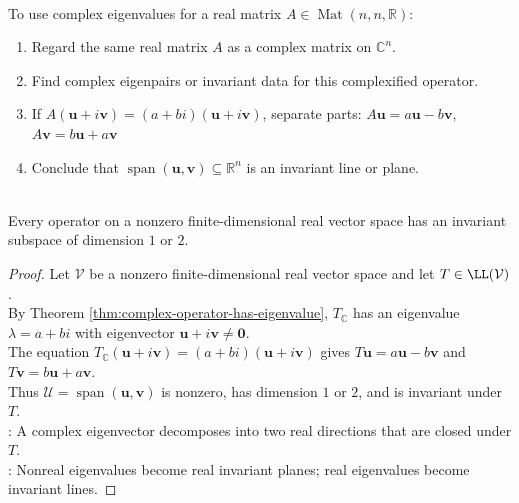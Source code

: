 \begin{method} \label{meth:complexify-real-matrix} \\
To use complex eigenvalues for a real matrix $A\in\operatorname{Mat}(n,n,\mathbb{R})$:
\begin{enumerate}[label=(\roman*)]
\setlength{\itemsep}{0pt}
\item Regard the same real matrix $A$ as a complex matrix on $\mathbb{C}^n$.
\item Find complex eigenpairs or invariant data for this complexified operator.
\item If $A(\mathbf{u}+i\mathbf{v})=(a+bi)(\mathbf{u}+i\mathbf{v})$, separate parts: $A\mathbf{u}=a\mathbf{u}-b\mathbf{v}$, $A\mathbf{v}=b\mathbf{u}+a\mathbf{v}$
\item Conclude that $\operatorname{span}(\mathbf{u},\mathbf{v})\subseteq\mathbb{R}^n$ is an invariant line or plane.
\end{enumerate}
\end{method}

\begin{theorem} \label{thm:real-operator-invariant-line-or-plane} \\
Every operator on a nonzero finite-dimensional real vector space has an invariant subspace of dimension $1$ or $2$.
\begin{proof}
Let $\mathcal{V}$ be a nonzero finite-dimensional real vector space and let $T\in\LL(\mathcal{V})$.\\
By Theorem \ref{thm:complex-operator-has-eigenvalue}, $T_{\mathbb{C}}$ has an eigenvalue $\lambda=a+bi$ with eigenvector $\mathbf{u}+i\mathbf{v}\neq\mathbf{0}$.\\
The equation $T_{\mathbb{C}}(\mathbf{u}+i\mathbf{v})=(a+bi)(\mathbf{u}+i\mathbf{v})$ gives $T\mathbf{u}=a\mathbf{u}-b\mathbf{v}$ and $T\mathbf{v}=b\mathbf{u}+a\mathbf{v}$.\\
Thus $\mathcal{U}=\operatorname{span}(\mathbf{u},\mathbf{v})$ is nonzero, has dimension $1$ or $2$, and is invariant under $T$.\\
: A complex eigenvector decomposes into two real directions that are closed under $T$.\\
: Nonreal eigenvalues become real invariant planes; real eigenvalues become invariant lines.
\end{proof}
\end{theorem}

